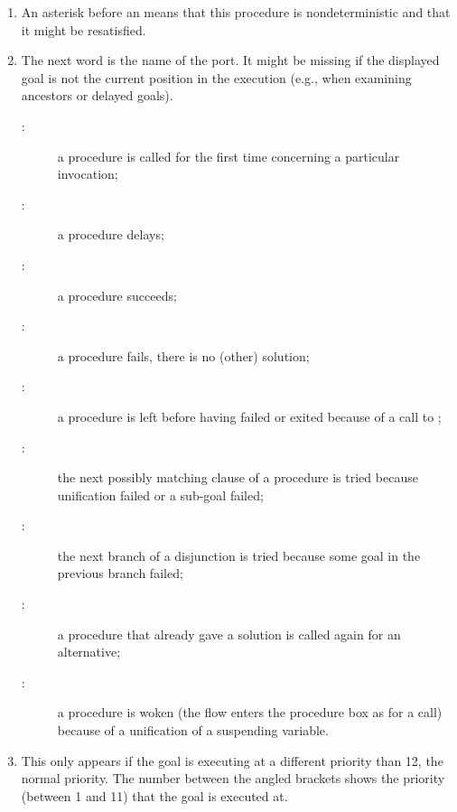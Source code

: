 \begin{enumerate}
\item An asterisk before an  means that this
procedure is nondeterministic and that it might be resatisfied.

\item The next word is the name of the port.
It might be missing if the displayed goal is not the current position
in the execution (e.g., when examining ancestors or delayed goals).

\begin{description}
\item[:] a procedure is called for the first time concerning a
  particular
invocation;

\item[:] a procedure delays;

\item[:] a procedure succeeds;

\item[:] a procedure fails, there is no (other) solution;

\item[:] a procedure is left before having failed or exited
  because
of a call to ;

\item[:] the next possibly matching clause of a procedure is
  tried
because unification failed or a sub-goal failed;

\item[:] the next branch of a disjunction is tried because some
  goal
in the previous branch failed;

\item[:] a procedure that already gave a solution is called again
  for
an alternative;

\item[:] a procedure is woken (the flow enters the procedure
  box as for
a call) because of a unification of a suspending variable.


\end{description}

\item This only appears if the goal is executing at a different priority
  than 12, the normal priority. The number between the angled brackets
  shows the priority (between 1 and 11) that the  goal is executed at.


\end{enumerate}
